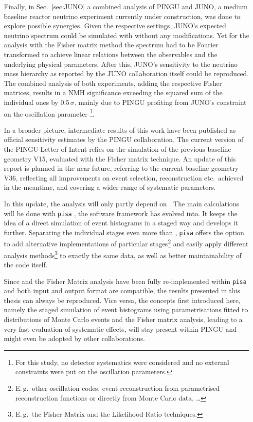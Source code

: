 Finally, in Sec.~\ref{sec:JUNO} a combined analysis of PINGU and JUNO, a medium
baseline reactor neutrino experiment currently under construction, was done to
explore possible synergies. Given the respective settings, JUNO's expected
neutrino spectrum could be simulated with \papa without any modifications. Yet
for the analysis with the Fisher matrix method the spectrum had to be Fourier
transformed to achieve linear relations between the observables and the 
underlying physical
parameters. After this, JUNO's sensitivity to the neutrino mass hierarchy as
reported by the JUNO collaboration itself could be reproduced. The combined
analysis of both experiments, \ie adding the respective Fisher matrices,
results in a NMH significance exceeding the squared sum of the individual ones
by 0.5\,$\sigma$, mainly due to PINGU profiting from JUNO's constraint on the
oscillation parameter \footnote{For this study, no detector systematics
were considered and no external constraints were put on the oscillation
parameters.}.

In a broader picture, intermediate results of this work have been published as
official sensitivity estimates by the PINGU collaboration. The current version
of the PINGU Letter of Intent \cite{LoI} relies on the \papa simulation of the
previous baseline geometry V15, evaluated with the Fisher matrix technique. An
update of this report is planned in the near future, referring to the
current baseline geometry V36, reflecting all improvements on event
selection, reconstruction etc.\ achieved in the meantime, and covering a wider
range of systematic parameters.

In this update, the analysis will only partly depend on \papa. The main
calculations will be done with \texttt{pisa} \cite{pisa}, the software framework
\papa has evolved into. It keeps the idea of a direct simulation of event
histograms in a staged way and develops it further. Separating the individual
stages even more than \papa, \texttt{pisa} offers the option to add alternative
implementations of particular stages\footnote{E.\,g.\ other oscillation codes,
event reconstruction from parametrised reconstruction functions or directly
from Monte Carlo data, \dots} and easily apply different analysis
methods\footnote{E.\,g.\ the Fisher Matrix and the Likelihood Ratio techniques.}
to exactly the same data, as well as better maintainability of the code itself.

Since \papa and the Fisher Matrix analysis have been fully re-implemented
within \texttt{pisa} and both input and output format are compatible, the
results presented in this thesis can always be reproduced. Vice versa, the
concepts first introduced here, namely the staged simulation of event
histograms using parametrisations fitted to distributions of Monte Carlo events
and the Fisher matrix analysis, leading to a very fast evaluation of systematic
effects, will stay present within PINGU and might even be adopted by other
collaborations.